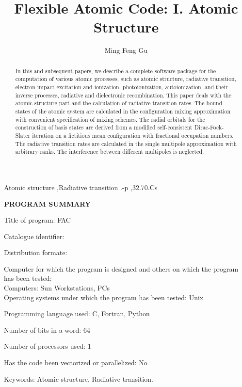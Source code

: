 \documentclass{elsart}
\begin{document}
\begin{frontmatter}

\title{Flexible Atomic Code: I. Atomic Structure} 
\author{Ming Feng Gu}
\address{Massachusetts Institute of Technology, Cambridge, MA 02139, USA}

\begin{abstract}
In this and subsequent papers, we describe a complete software package for
the computation of various atomic processes, such as atomic structure,
radiative transition, electron impact excitation and ionization,
photoionization, autoionization, and their inverse processes, radiative and
dielectronic recombination. This paper deals with the atomic structure part
and the calculation of radiative transition rates. The bound states of the
atomic system are calculated in the configuration mixing approximation with
convenient specification of mixing schemes. The radial orbitals for the
construction of basis states are derived from a modified self-consistent
Dirac-Fock-Slater 
iteration on a fictitious mean configuration with fractional occupation
numbers. The radiative transition rates are calculated in the single multipole
approximation with arbitrary ranks. The interference between 
different multipoles is neglected. 
\end{abstract}

\begin{keyword}
Atomic structure \sep Radiative transition
.-p \sep 32.70.Cs
\end{keyword}
\end{frontmatter}

\textbf{\large PROGRAM SUMMARY}

Title of program: FAC

Catalogue identifier:

Distribution formate:

Computer for which the program is designed and others on which the program has
been tested:\\
Computers: Sun Workstations, PCs\\
Operating systems under which the program has been tested: Unix

Programming language used: C, Fortran, Python

Number of bits in a word: 64

Number of processors used: 1

Has the code been vectorized or parallelized: No

Keywords: Atomic structure, Radiative transition.
\end{document}

